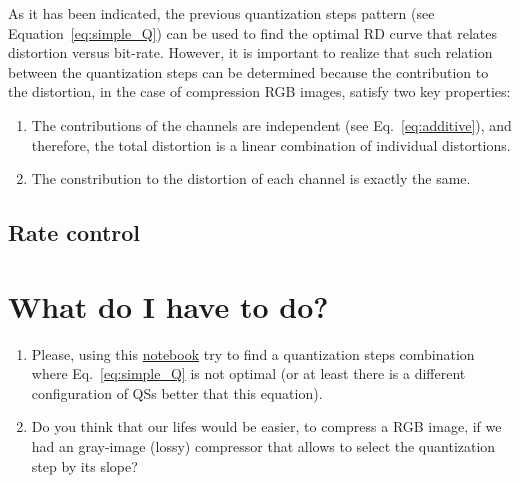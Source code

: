 As it has been indicated, the previous quantization steps pattern (see
Equation~\ref{eq:simple_Q}) can be used to find the optimal RD curve
that relates distortion versus bit-rate. However, it is important to
realize that such relation between the quantization steps can be
determined because the contribution to the distortion, in the case of
compression RGB images, satisfy two key properties:
\begin{enumerate}
\item The contributions of the channels are independent (see
  Eq.~\ref{eq:additive}), and therefore, the total distortion is a
  linear combination of individual distortions.
\item The constribution to the distortion of each channel is exactly
  the same.
\end{enumerate}


\subsection{Rate control}



\section{What do I have to do?}

\begin{enumerate}
\item Please, using this
  \href{https://github.com/Sistemas-Multimedia/Sistemas-Multimedia.github.io/blob/master/milestones/05-RGB_compression/RGB_compression.ipynb}{notebook}
  try to find a quantization steps combination where
  Eq.~\ref{eq:simple_Q} is not optimal (or at least there is a
  different configuration of QSs better that this equation).
\item Do you think that our lifes would be easier, to compress a RGB
  image, if we had an gray-image (lossy) compressor that allows to
  select the quantization step by its slope?
\end{enumerate}

